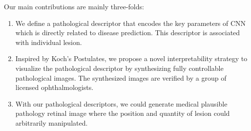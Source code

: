 \documentclass[letterpaper]{article} %
\begin{document}
	
	
	Our main contributions are mainly three-folds:
\begin{enumerate}
\item We define a pathological descriptor that encodes the key parameters of CNN which is directly related to disease prediction. This descriptor is associated with individual lesion. 
\item Inspired by Koch's Postulates, we propose a novel interpretability strategy to visualize the pathological descriptor by synthesizing fully controllable pathological images. The synthesized images are  verified  by a group of licensed  ophthalmologists.
\item With our pathological descriptors, we could generate medical plausible pathology retinal image where the position and quantity of lesion could arbitrarily manipulated.
\end{enumerate}
    
    
    
    
    
	
	
	
	
	
	
	
	
	
	
	
	
	
\end{document}

